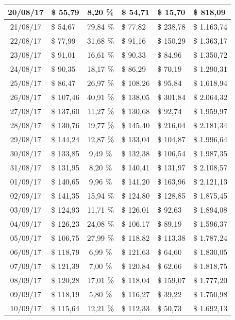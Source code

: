 \begin{center}
\begin{small}
\begin{longtable}{|c|l|c|l|l|l|}
20/08/17 & \$ 55,79 & 8,20 \% & \$ 54,71 & \$ 15,70 & \$ 818,09 \\ \hline
21/08/17 & \$ 54,67 & 79,84 \% & \$ 77,82 & \$ 238,78 & \$ 1.163,74 \\ \hline
22/08/17 & \$ 77,99 & 31,68 \% & \$ 91,16 & \$ 150,29 & \$ 1.363,17 \\ \hline
23/08/17 & \$ 91,01 & 16,61 \% & \$ 90,33 & \$ 84,96 & \$ 1.350,72 \\ \hline
24/08/17 & \$ 90,35 & 18,17 \% & \$ 86,29 & \$ 70,19 & \$ 1.290,31 \\ \hline
25/08/17 & \$ 86,47 & 26,97 \% & \$ 108,26 & \$ 95,84 & \$ 1.618,94 \\ \hline
26/08/17 & \$ 107,46 & 40,91 \% & \$ 138,05 & \$ 301,84 & \$ 2.064,32 \\ \hline
27/08/17 & \$ 137,60 & 11,27 \% & \$ 130,68 & \$ 92,74 & \$ 1.959,97 \\ \hline
28/08/17 & \$ 130,76 & 19,77 \% & \$ 145,40 & \$ 216,04 & \$ 2.181,34 \\ \hline
29/08/17 & \$ 144,24 & 12,87 \% & \$ 133,04 & \$ 104,87 & \$ 1.996,64 \\ \hline
30/08/17 & \$ 133,85 & 9,49 \% & \$ 132,38 & \$ 106,54 & \$ 1.987,35 \\ \hline
31/08/17 & \$ 131,95 & 8,20 \% & \$ 140,41 & \$ 131,97 & \$ 2.108,57 \\ \hline
01/09/17 & \$ 140,65 & 9,96 \% & \$ 141,20 & \$ 163,96 & \$ 2.121,13 \\ \hline
02/09/17 & \$ 141,35 & 15,94 \% & \$ 124,80 & \$ 128,85 & \$ 1.875,45 \\ \hline
03/09/17 & \$ 124,93 & 11,71 \% & \$ 126,01 & \$ 92,63 & \$ 1.894,08 \\ \hline
04/09/17 & \$ 126,23 & 24,08 \% & \$ 106,17 & \$ 89,19 & \$ 1.596,37 \\ \hline
05/09/17 & \$ 106,75 & 27,99 \% & \$ 118,82 & \$ 113,38 & \$ 1.787,24 \\ \hline
06/09/17 & \$ 118,79 & 6,99 \% & \$ 121,63 & \$ 64,60 & \$ 1.830,05 \\ \hline
07/09/17 & \$ 121,39 & 7,00 \% & \$ 120,84 & \$ 62,66 & \$ 1.818,75 \\ \hline
08/09/17 & \$ 120,28 & 17,01 \% & \$ 118,04 & \$ 159,07 & \$ 1.777,20 \\ \hline
09/09/17 & \$ 118,19 & 5,80 \% & \$ 116,27 & \$ 39,22 & \$ 1.750,98 \\ \hline
10/09/17 & \$ 115,64 & 12,21 \% & \$ 112,33 & \$ 50,73 & \$ 1.692,13 \\ \hline

\end{longtable}
\end{small}
\end{center}
